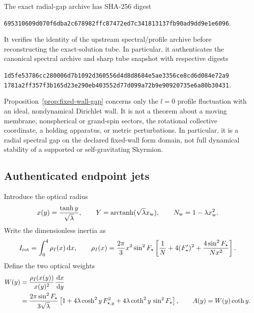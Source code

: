 The exact radial-gap archive has SHA-256 digest
\begin{center}
\small\nolinkurl{695310609d070f6dba2c678982ffc87472ed7c341813137fb90ad9dd9e1e6096}.
\end{center}
It verifies the identity of the upstream spectral/profile archive before
reconstructing the exact-solution tube.  In particular, it authenticates the
canonical spectral archive and sharp tube snapshot with respective digests
\begin{center}
\small
\nolinkurl{1d5fe53786cc280006d7b1092d360556d4d8d8684e5ae3356ce8cd6d084e72a9}\\
\nolinkurl{1781a2ff357f3b165d23e290eb403552d77d099a72b9e90920735e6a80b30431}.
\end{center}

\begin{remark}
Proposition~\ref{prop:fixed-wall-gap} concerns only the $l=0$ profile
fluctuation with an ideal, nondynamical Dirichlet wall.  It is not a theorem
about a moving membrane, nonspherical or grand-spin sectors, the rotational
collective coordinate, a holding apparatus, or metric perturbations.  In
particular, it is a radial spectral gap on the declared fixed-wall form domain,
not full dynamical stability of a supported or self-gravitating Skyrmion.
\end{remark}

\subsection{Authenticated endpoint jets}
\label{sec:endpoint-jets}

Introduce the optical radius
\begin{equation}
 x(y)=\frac{\tanh y}{\sqrt\lambda},
 \qquad
 Y=\operatorname{arctanh}(\sqrt\lambda x_{\rm w}),
 \qquad
 N_{\rm w}=1-\lambda x_{\rm w}^2.
 \label{eq:optical-coordinate}
\end{equation}
Write the dimensionless inertia as
\begin{equation}
 I_{\rm rot}=\int_0^4\rho_I(x)\,\mathrm d x,
 \qquad
 \rho_I(x)=\frac{2\pi}{3}x^2\sin^2F_\star
 \left[\frac1N+4(F_\star')^2
       +\frac{4\sin^2F_\star}{Nx^2}\right].
 \label{eq:inertia-density}
\end{equation}
Define the two optical weights
\begin{align}
 W(y)&=\frac{\rho_I(x(y))}{x(y)^2}\frac{\,\mathrm d x}{\,\mathrm d y}
 \notag\\
 &=\frac{2\pi\sin^2F_\star}{3\sqrt\lambda}
 \left[1+4\lambda\cosh^2y\,F_{\star,y}^2
       +4\lambda\coth^2y\,\sin^2F_\star\right],
 \qquad A(y)=W(y)\coth y.
 \label{eq:optical-weights}
\end{align}


